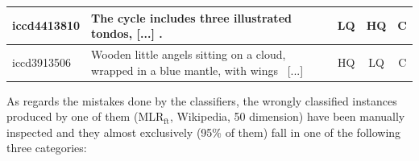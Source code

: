 \documentclass[epsfig,a4paper,12pt,titlepage]{book}
\newcommand{\mlr}{MLR$_\text{ft}$\xspace}
\begin{document}
\begin{table}[h]
{\begin{tabular}{|l|p{12cm}|c|c|c|}
iccd4413810  & The cycle includes three illustrated tondos, [...] .                                                               & LQ    & HQ  &   C            \\ \hline
iccd3913506  & Wooden little angels sitting on a cloud, wrapped in a blue mantle, with wings ~[...]                               & HQ    & LQ  & C         \\ \hline
                

\end{tabular}
}
\end{table}

\begin{table}[h]
\caption{Sample of high-quality (HQ) and low-quality (LQ) annotated records correctly classified by the approach.}
\label{tab:record_buoni}       %
\setlength{\tabcolsep}{3pt}
\centering
{}
\end{table}

As regards the mistakes done by the classifiers, the wrongly classified instances produced by one of them (\mlr, Wikipedia, 50 dimension) have been manually inspected and they almost exclusively (95\% of them) fall in one of the following three categories:
\end{document}
